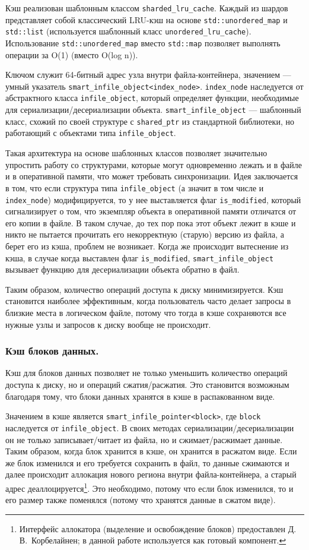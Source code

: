 Кэш реализован шаблонным классом \texttt{sharded\_lru\_cache}. Каждый из шардов представляет собой классический LRU-кэш на основе \texttt{std::unordered\_map} и \texttt{std::list} (используется шаблонный класс \texttt{unordered\_lru\_cache}). Использование \texttt{std::unordered\_map} вместо \texttt{std::map} позволяет выполнять операции за O(1) (вместо O(log n)).

Ключом служит 64-битный адрес узла внутри файла-контейнера, значением --- умный указатель \texttt{smart\_infile\_object<index\_node>}. \texttt{index\_node} наследуется от абстрактного класса \texttt{infile\_object}, который определяет функции, необходимые для сериализации/десериализации объекта. \texttt{smart\_infile\_object} --- шаблонный класс, схожий по своей структуре с \texttt{shared\_ptr} из стандартной библиотеки, но работающий с объектами типа \texttt{infile\_object}. 

Такая архитектура на основе шаблонных классов позволяет значительно упростить работу со структурами, которые могут одновременно лежать и в файле и в оперативной памяти, что может требовать синхронизации. Идея заключается в том, что если структура типа \texttt{infile\_object} (а значит в том числе и \texttt{index\_node}) модифицируется, то у нее выставляется флаг \texttt{is\_modified}, который сигнализирует о том, что экземпляр объекта в оперативной памяти отличатся от его копии в файле. В таком случае, до тех пор пока этот объект лежит в кэше и никто не пытается прочитать его некорректную (старую) версию из файла, а берет его из кэша, проблем не возникает. Когда же происходит вытеснение из кэша, в случае когда выставлен флаг \texttt{is\_modified}, \texttt{smart\_infile\_object} вызывает функцию для десериализации объекта обратно в файл.

Таким образом, количество операций доступа к диску минимизируется. Кэш становится наиболее эффективным, когда пользователь часто делает запросы в близкие места в логическом файле, потому что тогда в кэше сохраняются все нужные узлы и запросов к диску вообще не происходит.

\subsubsection{Кэш блоков данных.}
Кэш для блоков данных позволяет не только уменьшить количество операций доступа к диску, но и операций сжатия/расжатия. Это становится возможным благодаря тому, что блоки данных хранятся в кэше в распакованном виде. 

Значением в кэше является \texttt{smart\_infile\_pointer<block>}, где \texttt{block} наследуется от \texttt{infile\_object}. В своих методах сериализации/десериализации он не только записывает/читает из файла, но и сжимает/расжимает данные. Таким образом, когда блок хранится в кэше, он хранится в расжатом виде. Если же блок изменился и его требуется сохранить в файл, то данные сжимаются и далее происходит аллокация нового региона внутри файла-контейнера, а старый адрес деаллоцируется\footnote{Интерфейс аллокатора (выделение и освобождение блоков) предоставлен Д.\,В.~Корбелайнен; в данной работе используется как готовый компонент.}. Это необходимо, потому что если блок изменился, то и его размер также поменялся (потому что хранятся данные в сжатом виде).

